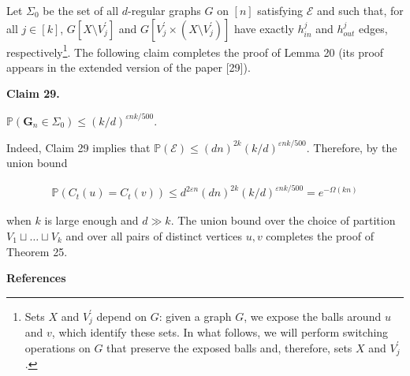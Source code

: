 \documentclass[10pt,a4paper]{article}
\begin{document}
Let $\Sigma_{0}$ be the set of all $d$-regular graphs $G$ on $[n]$ satisfying $\mathcal{E}$ and such that, for all $j\in[k]$, $G[X\setminus V^{\prime}_{j}]$ and $G[V^{\prime}_{j}\times(X\setminus V^{\prime}_{j})]$ have exactly $h^{j}_{in}$ and $h^{j}_{out}$ edges, respectively\footnote{Sets $X$ and $V^{\prime}_{j}$ depend on $G$: given a graph $G$, we expose the balls around $u$ and $v$, which identify these sets. In what follows, we will perform switching operations on $G$ that preserve the exposed balls and, therefore, sets $X$ and $V^{\prime}_{j}$.}. The following claim completes the proof of Lemma 20 (its proof appears in the extended version of the paper [29]).\par





\par\medskip\noindent\textbf{
Claim 29. 
}\par



$\mathbb{P}(\mathbf{G}_{n}\in\Sigma_{0})\leq(k/d)^{\varepsilon nk/500}$.\par






Indeed, Claim 29 implies that $\mathbb{P}(\mathcal{E})\leq(dn)^{2k}(k/d)^{\varepsilon nk/500}$. Therefore, by the union bound\par


\[\begin{gathered}
\mathbb{P}(C_{t}(u)=C_{t}(v))\leq d^{2\varepsilon n}(dn)^{2k}(k/d)^{\varepsilon nk/500}=e^{-\Omega(kn)}
\end{gathered}\]


when $k$ is large enough and $d\gg k$. The union bound over the choice of partition $V_{1}\sqcup\ldots\sqcup V_{k}$ and over all pairs of distinct vertices $u,v$ completes the proof of Theorem 25.\par






\par\medskip\noindent\textbf{References}\par
\end{document}
